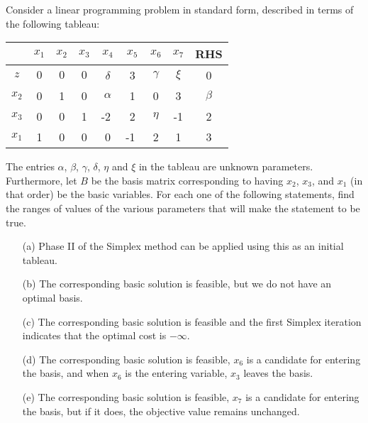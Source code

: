 \renewcommand{\arraystretch}{1.1}
\setlength{\tabcolsep}{8pt}
Consider a linear programming problem in standard form, described in terms of the following tableau:
%
\begin{center}
\begin{tabular}{c|ccccccc|c}
  & $x_1$ & $x_2$ & $x_3$ & $x_4$ & $x_5$ & $x_6$ & $x_7$ & RHS\\
\hline
 $z$        &$0$ & $0$ & $0$ & $\delta$ & 3 & $\gamma$ & $\xi$ & 0\\
\hline
$x_2$   &  0 & 1 & 0 & $\alpha$ & 1 & 0      &  3 & $\beta$ \\
$x_3$   &  0 & 0 & 1 & -2\,\,       & 2 & $\eta$ & -1 &  2 \\
$x_1$   &  1 & 0 & 0 &  0       &-1\,\, & 2      &  1 &  3 \\ \hline
\end{tabular}
\end{center}
%
The entries $\alpha$, $\beta$, $\gamma$, $\delta$, $\eta$ and $\xi$ in the tableau are unknown parameters. Furthermore, let $B$ be the basis matrix corresponding to having $x_2$, $x_3$, and $x_1$ (in that order) be the basic variables. For each one of the following statements, find the ranges of values of the various parameters that will make the statement to be true.
\begin{itemize}
\item[(a)] Phase II of the Simplex method can be applied using this as an initial tableau.
\item[(b)] The corresponding basic solution is feasible, but we do not have an optimal basis.
\item[(c)] The corresponding basic solution is feasible and the first Simplex iteration indicates that the optimal cost is $-\infty$.
\item[(d)] The corresponding basic solution is feasible, $x_6$ is a candidate for entering the basis, and when $x_6$ is the entering variable, $x_3$ leaves the basis.  
\item[(e)] The corresponding basic solution is feasible, $x_7$ is a candidate for entering the basis, but if it does, the objective value remains unchanged.
\end{itemize}